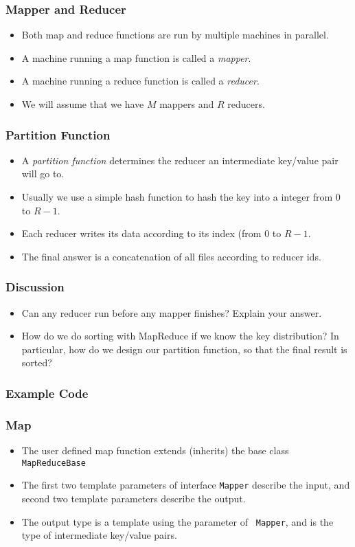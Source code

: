 \documentclass{beamer}
\begin{document}
\begin{frame}
  \frametitle{Mapper and Reducer}
  \begin{itemize}
    \item Both map and reduce functions are run by multiple machines
      in parallel.
    \item A machine running a map function is called a {\em mapper}.
    \item A machine running a reduce function is called a {\em
      reducer}.
    \item We will assume that we have $M$ mappers and $R$ reducers.
  \end{itemize}
\end{frame}

\begin{frame}
  \frametitle{Partition Function}
  \begin{itemize}
    \item A {\em partition function} determines the reducer an
      intermediate key/value pair will go to.
    \item Usually we use a simple hash function to hash the key into a
      integer from 0 to $R - 1$.
    \item Each reducer writes its data according to its index (from 0
      to $R -1$.
    \item The final answer is a concatenation of all files according
      to reducer ids.
  \end{itemize}
\end{frame}

\begin{frame}
  \frametitle{Discussion}
  \begin{itemize}
  \item Can any reducer run before any mapper finishes?  Explain your
    answer.
  \item How do we do sorting with MapReduce if we know the key
    distribution?  In particular, how do we design our partition
    function, so that the final result is sorted?
  \end{itemize}
\end{frame}

\subsubsection{Example Code}

\begin{frame}
  \frametitle{Map}
  \begin{itemize}
    \item The user defined map function extends (inherits) the base
      class {\tt MapReduceBase}
    \item The first two template parameters of interface {\tt Mapper}
      describe the input, and second two template parameters describe
      the output.
    \item The output type is a template using the parameter of {\tt
      Mapper}, and is the type of intermediate key/value pairs.
  \end{itemize}
\end{frame}
\end{document}
